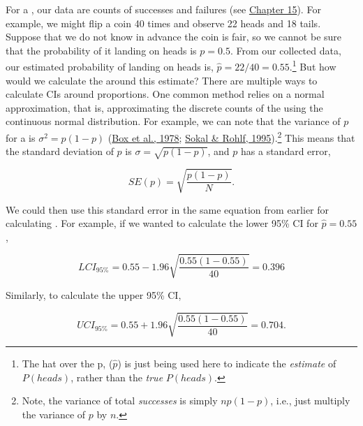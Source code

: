 \documentclass[
  openany]{krantz}
\begin{document}
For a , our data are counts of successes and failures (see \protect\hyperlink{Chapter_15}{Chapter 15}).
For example, we might flip a coin 40 times and observe 22 heads and 18 tails.
Suppose that we do not know in advance the coin is fair, so we cannot be sure that the probability of it landing on heads is \(p = 0.5\).
From our collected data, our estimated probability of landing on heads is, \(\hat{p} = 22/40 = 0.55\).\footnote{The hat over the p, (\(\hat{p}\)) is just being used here to indicate the \emph{estimate} of \(P(heads)\), rather than the \emph{true} \(P(heads)\).}
But how would we calculate the  around this estimate?
There are multiple ways to calculate CIs around proportions.
One common method relies on a normal approximation, that is, approximating the discrete counts of the  using the continuous normal distribution.
For example, we can note that the variance of \(p\) for a  is \(\sigma^{2} = p\left(1 - p\right)\) (\protect\hyperlink{ref-Box1978}{Box et al., 1978}; \protect\hyperlink{ref-Sokal1995}{Sokal \& Rohlf, 1995}).\footnote{Note, the variance of total \emph{successes} is simply \(np\left(1 - p\right)\), i.e., just multiply the variance of \(p\) by \(n\).}
This means that the standard deviation of \(p\) is \(\sigma = \sqrt{p\left(1 - p\right)}\), and \(p\) has a standard error,

\[SE(p) = \sqrt{\frac{p\left(1 - p\right)}{N}}.\]

We could then use this standard error in the same equation from earlier for calculating .
For example, if we wanted to calculate the lower 95\% CI for \(\hat{p} = 0.55\),

\[LCI_{95\%} = 0.55 - 1.96 \sqrt{\frac{0.55\left(1 - 0.55\right)}{40}} = 0.396\]

Similarly, to calculate the upper 95\% CI,

\[UCI_{95\%} = 0.55 + 1.96 \sqrt{\frac{0.55\left(1 - 0.55\right)}{40}} = 0.704.\]
\end{document}
